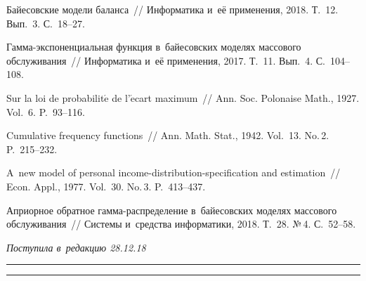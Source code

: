 \begin{multicols}{2}
{\small\frenchspacing
 {%
 \begin{thebibliography}{9}

Байесовские модели баланса~// Информатика и~её применения, 2018. Т.~12. Вып.~3. С.~18--27.

Гам\-ма-экс\-по\-нен\-ци\-аль\-ная функция в~байесовских моделях массового обслуживания~// 
Информатика и~её применения, 2017. Т.~11. Вып.~4. С.~104--108.

Sur la loi de probabilit$\acute{\mbox{e}}$ de l'$\acute{\mbox{e}}$cart maximum~// 
Ann. Soc. Polonaise Math., 1927. Vol.~6. P.~93--116.

Cumulative frequency functions~// Ann. Math. Stat., 1942. Vol.~13. No.\,2. P.~215--232.

A~new model of personal income-distribution-specification and estimation~// 
Econ. Appl., 1977. Vol.~30. No.\,3. P.~413--437.


Априорное обратное гам\-ма-рас\-пре\-де\-ле\-ние в~байесовских моделях массового 
обслуживания~// Системы и~средства информатики, 2018. Т.~28. №\,4. С.~52--58.
 \end{thebibliography}

 }
 }

\end{multicols}

\vspace*{-3pt}

\hfill{\small\textit{Поступила в~редакцию 28.12.18}}

\vspace*{8pt}




\hrule

\vspace*{2pt}

\hrule


\def\tit{\textit{A PRIORI} FRECHET AND~SCALED INVERSE CHI DISTRIBUTION IN~BAYESIAN BALANCE MODELS}


